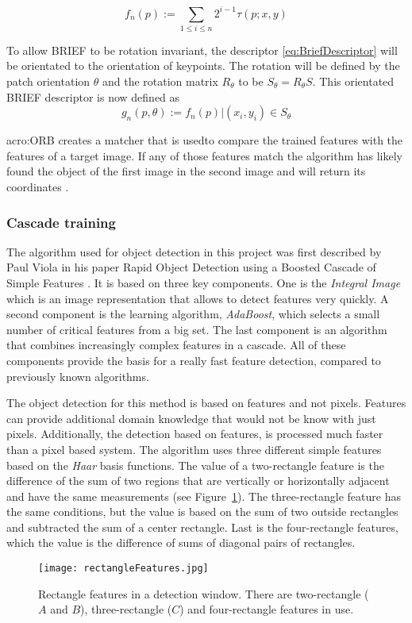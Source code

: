 \begin{equation}\label{eq:BinaryFeature} f_{n}(p) := \sum_{1 \leq i \leq n}2^{i-1} \tau(p;x,y)\end{equation}

To allow BRIEF to be rotation invariant, the descriptor \eqref{eq:BriefDescriptor} will be orientated to the orientation of keypoints. The rotation will be defined by the patch orientation $\theta$ and the rotation matrix $R_{\theta}$ to be $S_{\theta} = R_{\theta}S$.
This orientated BRIEF descriptor is now defined as
\begin{equation}\label{eq:BriefDescriptor} g_{n}(p,\theta) := f_{n}(p)|(x_{i},y_{i}) \in S_{\theta}\end{equation}

\acrshort{acro:ORB} creates a matcher that is usedto compare the trained features with the features of a target image. If any of those features match the algorithm has likely found the object of the first image in the second image and will return its coordinates \citep{rublee_rabaud_konolige_bradski_2011}.

\subsubsection{Cascade training}
\label{sub:CascadeTraining}
The algorithm used for object detection in this project was first described by Paul Viola in his paper Rapid Object Detection using a Boosted Cascade of Simple Features \citep{viola_jones_2001}. It is based on three key components. One is the \textit{Integral Image} which is an image representation that allows to detect features very quickly. A second component is the learning algorithm, \textit{AdaBoost}, which selects a small number of critical features from a big set. The last component is an algorithm that combines increasingly complex features in a cascade. All of these components provide the basis for a really fast feature detection, compared to previously known algorithms.

The object detection for this method is based on features and not pixels. Features can provide additional domain knowledge that would not be know with just pixels. Additionally, the detection based on features, is processed much faster than a pixel based system. The algorithm uses three different simple features based on the \textit{Haar} basis functions. The value of a two-rectangle feature is the difference of the sum of two regions that are vertically or horizontally adjacent and have the same measurements (see Figure~\ref{fig:rectFeat}). The three-rectangle feature has the same conditions, but the value is based on the sum of two outside rectangles and subtracted the sum of a center rectangle. Last is the four-rectangle features, which the value is the difference of sums of diagonal pairs of rectangles.
\begin{figure}[H]
	\centering
	\texttt{[image: rectangleFeatures.jpg]}
	\caption{Rectangle features in a detection window. There are two-rectangle ($A$ and $B$), three-rectangle ($C$) and four-rectangle features in use.}
	\label{fig:rectFeat}
\end{figure}

